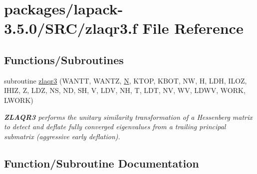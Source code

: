\hypertarget{zlaqr3_8f}{}\section{packages/lapack-\/3.5.0/\+S\+R\+C/zlaqr3.f File Reference}
\label{zlaqr3_8f}
\subsection*{Functions/\+Subroutines}
\begin{DoxyCompactItemize}
\item 
subroutine \hyperlink{zlaqr3_8f_aa3585465a2ddb0ab5072a9b2a38f1338}{zlaqr3} (W\+A\+N\+T\+T, W\+A\+N\+T\+Z, \hyperlink{polmisc_8c_a0240ac851181b84ac374872dc5434ee4}{N}, K\+T\+O\+P, K\+B\+O\+T, N\+W, H, L\+D\+H, I\+L\+O\+Z, I\+H\+I\+Z, Z, L\+D\+Z, N\+S, N\+D, S\+H, V, L\+D\+V, N\+H, T, L\+D\+T, N\+V, W\+V, L\+D\+W\+V, W\+O\+R\+K, L\+W\+O\+R\+K)
\begin{DoxyCompactList}\small\item\em {\bfseries Z\+L\+A\+Q\+R3} performs the unitary similarity transformation of a Hessenberg matrix to detect and deflate fully converged eigenvalues from a trailing principal submatrix (aggressive early deflation). \end{DoxyCompactList}\end{DoxyCompactItemize}


\subsection{Function/\+Subroutine Documentation}
\hypertarget{zlaqr3_8f_aa3585465a2ddb0ab5072a9b2a38f1338}{}
